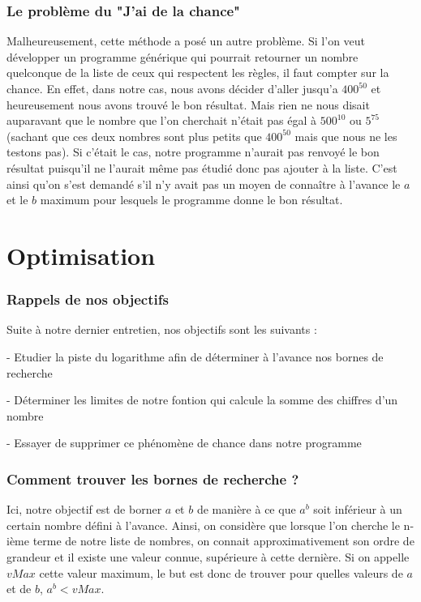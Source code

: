 \documentclass{article}
\begin{document}
\section{Le problème du "J'ai de la chance"}
Malheureusement, cette méthode a posé un autre problème. Si l'on veut développer un programme générique qui pourrait retourner un nombre quelconque de la liste de ceux qui respectent les règles, il faut compter sur la chance. En effet, dans notre cas, nous avons décider d'aller jusqu'a $400^{50}$ et heureusement nous avons trouvé le bon résultat. Mais rien ne nous disait auparavant que le nombre que l'on cherchait n'était pas égal à $500^{10}$ ou $5^{75}$ (sachant que ces deux nombres sont plus petits que $400^{50}$ mais que nous ne les testons pas). Si c'était le cas, notre programme n'aurait pas renvoyé le bon résultat puisqu'il ne l'aurait même pas étudié donc pas ajouter à la liste. C'est ainsi qu'on s'est demandé s'il n'y avait pas un moyen de connaître à l'avance le $a$ et le $b$ maximum pour lesquels le programme donne le bon résultat.

\part {Optimisation}
\section {Rappels de nos objectifs}
Suite à notre dernier entretien, nos objectifs sont les suivants :

- Etudier la piste du logarithme afin de déterminer à l'avance nos bornes de recherche

- Déterminer les limites de notre fontion qui calcule la somme des chiffres d'un nombre

- Essayer de supprimer ce phénomène de chance dans notre programme

\section{Comment trouver les bornes de recherche ?}

Ici, notre objectif est de borner $a$ et $b$ de manière à ce que $a^{b}$ soit inférieur à un certain nombre défini à l'avance. Ainsi, on considère que lorsque l'on cherche le n-ième terme de notre liste de nombres, on connait approximativement son ordre de grandeur et il existe une valeur connue, supérieure à cette dernière. Si on appelle $vMax$ cette valeur maximum, le but est donc de trouver pour quelles valeurs de $a$ et de $b$, $a^{b}  < vMax$.
\end{document}
